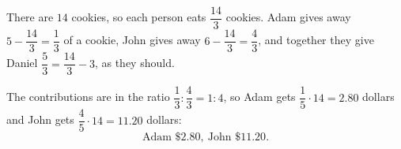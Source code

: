 There are $14$ cookies, so each person eats $\dfrac{14}{3}$ cookies. Adam gives away $5-\dfrac{14}3=\dfrac13$ of a cookie, John gives away $6-\dfrac{14}3=\dfrac43$, and together they give Daniel $\dfrac53=\dfrac{14}3-3$, as they should.

The contributions are in the ratio $\dfrac13:\dfrac43=1:4$, so Adam gets $\dfrac15\cdot14=2.80$ dollars and John gets $\dfrac45\cdot14=11.20$ dollars:
\[\boxed{\text{Adam }\$2.80,\ \text{John }\$11.20}.\]
